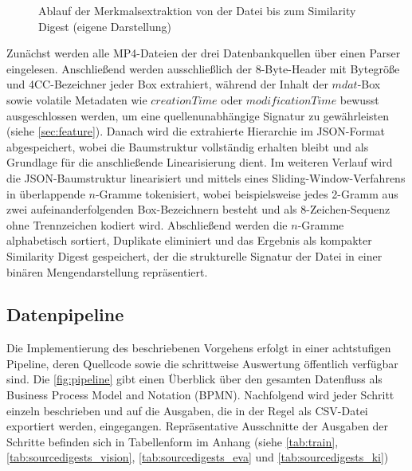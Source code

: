 \begin{figure}[h]
    \caption{Ablauf der Merkmalsextraktion von der Datei bis zum Similarity Digest (eigene Darstellung)}
    \label{fig:vorgehen}
\end{figure}

Zunächst werden alle MP4-Dateien der drei Datenbankquellen über einen Parser eingelesen. Anschließend werden ausschließlich der 8-Byte-Header mit Bytegröße und 4CC-Bezeichner jeder Box extrahiert, während der Inhalt der \(mdat\)-Box sowie volatile Metadaten wie \(creationTime\) oder \(modificationTime\) bewusst ausgeschlossen werden, um eine quellenunabhängige Signatur zu gewährleisten (siehe \cref{sec:feature}). Danach wird die extrahierte Hierarchie im JSON-Format abgespeichert, wobei die Baumstruktur vollständig erhalten bleibt und als Grundlage für die anschließende Linearisierung dient. Im weiteren Verlauf wird die JSON-Baumstruktur linearisiert und mittels eines Sliding-Window-Verfahrens \cite[Kap.~3]{klier_media_2025} in überlappende \(n\)-Gramme tokenisiert, wobei beispielsweise jedes 2-Gramm aus zwei aufeinanderfolgenden Box-Bezeichnern besteht und als 8-Zeichen-Sequenz ohne Trennzeichen kodiert wird. Abschließend werden die \(n\)-Gramme alphabetisch sortiert, Duplikate eliminiert und das Ergebnis als kompakter Similarity Digest gespeichert, der die strukturelle Signatur der Datei in einer binären Mengendarstellung repräsentiert.


\subsection{Datenpipeline}
\label{sec:pipeline}

Die Implementierung des beschriebenen Vorgehens erfolgt in einer achtstufigen Pipeline, deren Quellcode sowie die schrittweise Auswertung öffentlich verfügbar sind. Die \cref{fig:pipeline} gibt einen Überblick über den gesamten Datenfluss als Business Process Model and Notation (BPMN). Nachfolgend wird jeder Schritt einzeln beschrieben und auf die Ausgaben, die in der Regel als CSV-Datei exportiert werden, eingegangen. Repräsentative Ausschnitte der Ausgaben der Schritte befinden sich in Tabellenform im Anhang (siehe \cref{tab:train}, \ref{tab:sourcedigests_vision}, \ref{tab:sourcedigests_eva} und \ref{tab:sourcedigests_ki})\\

